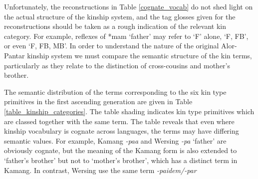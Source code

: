 Unfortunately, the reconstructions in Table \ref{cognate_vocab} do not shed light on the actual structure of the kinship system, and the tag glosses given for the reconstructions should be taken as a rough indication of the relevant kin category. For example, reflexes of *mam `father' may refer to `F' alone, `F, FB', or even `F, FB, MB'. In order to understand the nature of the original Alor-Pantar kinship system we must compare the semantic structure of the kin terms, particularly as they relate to the distinction of cross-cousins and mother's brother.

The semantic distribution of the terms corresponding to the six kin type primitives in the first ascending generation are given in Table \ref{table_kinship_categories}. The table shading indicates kin type primitives which are classed together with the same term. The table reveals that even where kinship vocabulary is cognate across languages, the terms may have differing semantic values. For example, Kamang \textit{-paa} and Wersing \textit{-pa} `father' are obviously cognate, but the meaning of the Kamang form is also extended to `father's brother' but not to `mother's brother', which has a distinct term in Kamang. In contrast, Wersing use the same term \textit{-paidem/-par}

 

